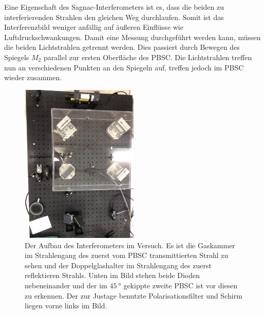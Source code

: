
\noindent Eine Eigenschaft des Sagnac-Interferometers ist es, dass die beiden zu interferierenden Strahlen den gleichen Weg durchlaufen. Somit ist das Interferenzbild weniger 
anfällig auf äußeren Einflüsse wie Luftdruckschwankungen. Damit eine Messung durchgeführt werden kann, müssen die beiden Lichtstrahlen getrennt werden. Dies passiert durch Bewegen 
des Spiegels $M_2$ parallel zur ersten Oberfläche des PBSC. Die Lichtstrahlen treffen nun an verschiedenen Punkten an den Spiegeln auf, treffen jedoch im PBSC wieder zusammen. 

\begin{figure}[h]
    \centering
    \includegraphics[width=0.5\textwidth]{bilder/interfer_foto.png}
    \caption{Der Aufbau des Interferometers im Versuch. Es ist die Gaskammer im Strahlengang des zuerst vom PBSC transmittierten Strahl zu sehen und der Doppelglashalter im Strahlengang 
    des zuerst reflektieren Strahls. Unten im Bild stehen beide Dioden nebeneinander und der im $\SI{45}{\degree}$ gekippte zweite PBSC ist vor diesen zu erkennen. Der zur Justage benutzte 
    Polarisationsfilter und Schirm liegen vorne links im Bild.}
    \label{fig:Interferob}   
\end{figure}


